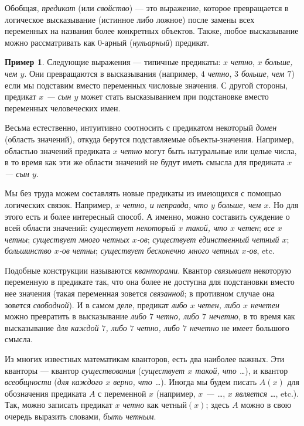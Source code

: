 \documentclass[12pt,notitlepage]{article}
\theoremstyle{plain}
\theoremstyle{definition}
\newtheorem{exm}[thm]{Пример}
\theoremstyle{plain}
\newcommand{\1}{\mathbf{1}}
\newcommand{\0}{\mathbf{0}}
\newcommand{\mcomm}[1]{}
\begin{document}
Обобщая, \emph{предикат} (или \emph{свойство}) --- это выражение, которое превращается в логическое высказывание (истинное либо ложное) после замены всех переменных на названия более конкретных объектов. Также, любое высказывание можно рассматривать как $0$-арный (\emph{нульарный}) предикат.

\begin{exm}
	Следующие выражения --- типичные предикаты: \emph{$x$ четно}, \emph{$x$ больше, чем $y$}. Они превращаются в высказывания (например, \emph{$4$ четно}, \emph{$3$ больше, чем $7$}) если мы подставим вместо переменных числовые значения. С другой стороны, предикат \emph{$x$ --- сын $y$} может стать высказыванием при подстановке вместо переменных человеческих имен.
\end{exm}
Весьма естественно, интуитивно соотносить с предикатом некоторый \emph{домен} (область значений), откуда берутся подставляемые объекты-значения. Например, областью значений предиката \emph{$x$ четно} могут быть натуральные или целые числа, в то время как эти же области значений не будут иметь смысла для предиката \emph{$x$ --- сын $y$}.

\mcomm{}

Мы без труда можем составлять новые предикаты из имеющихся с помощью логических связок. Например, \emph{$x$ четно, и неправда, что $y$ больше, чем $x$}. Но для этого есть и более интересный способ. А именно, можно составить суждение о всей области значений: \emph{существует некоторый $x$ такой, что $x$ четен}; \emph{все $x$ четны}; \emph{существует много четных $x$-ов}; \emph{существует единственный четный $x$}; \emph{большинство $x$-ов четны}; \emph{существует бесконечно много четных $x$-ов}, etc.

Подобные конструкции называются \emph{кванторами}. Квантор \emph{связывает} некоторую переменную в предикате так, что она более не доступна для подстановки вместо нее значения (такая переменная зовется \emph{связанной}; в противном случае она зовется \emph{свободной}). И в самом деле, предикат \emph{либо $x$ четен, либо $x$ нечетен} можно превратить в высказывание \emph{либо $7$ четно, либо $7$ нечетно}, в то время как высказывание \emph{для каждой $7$, либо $7$ четно, либо $7$ нечетно} не имеет большого смысла.

Из многих известных математикам кванторов, есть два наиболее важных. Эти кванторы --- квантор \emph{существования} (\emph{существует $x$ такой, что \dots}), и квантор \emph{всеобщности} (\emph{для каждого $x$ верно, что \dots}). Иногда мы будем писать $A(x)$ для обозначения предиката $A$ с переменной $x$ (например, \emph{$x$ --- \dots}, \emph{$x$ является \dots}, etc.). Так, можно записать предикат \emph{$x$ четно} как $\text{четный}(x)$; здесь $A$ можно в свою очередь выразить словами, \emph{быть четным}.
\end{document}
